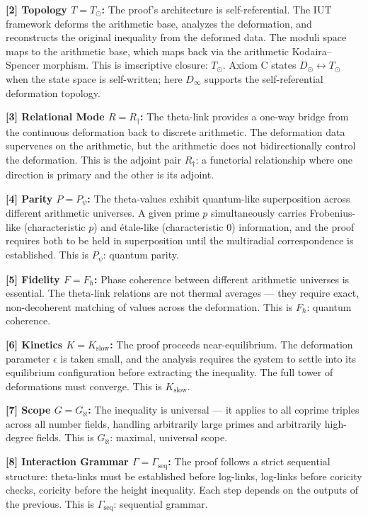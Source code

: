 \documentclass[12pt,a4paper]{article}
\begin{document}
\textbf{{[}2{]} Topology $T = T_{\odot}$:} The proof's architecture is self-referential. The IUT framework deforms the arithmetic base, analyzes the deformation, and reconstructs the original inequality from the deformed data. The moduli space maps to the arithmetic base, which maps back via the arithmetic Kodaira--Spencer morphism. This is imscriptive closure: $T_{\odot}$. Axiom C states $D_{\odot} \leftrightarrow T_{\odot}$ when the state space is self-written; here $D_{\infty}$ supports the self-referential deformation topology.

\textbf{{[}3{]} Relational Mode $R = R_{\dagger}$:} The theta-link provides a one-way bridge from the continuous deformation back to discrete arithmetic. The deformation data supervenes on the arithmetic, but the arithmetic does not bidirectionally control the deformation. This is the adjoint pair $R_{\dagger}$: a functorial relationship where one direction is primary and the other is its adjoint.

\textbf{{[}4{]} Parity $P = P_{\psi}$:} The theta-values exhibit quantum-like superposition across different arithmetic universes. A given prime $p$ simultaneously carries Frobenius-like (characteristic $p$) and étale-like (characteristic $0$) information, and the proof requires both to be held in superposition until the multiradial correspondence is established. This is $P_{\psi}$: quantum parity.

\textbf{{[}5{]} Fidelity $F = F_{\hbar}$:} Phase coherence between different arithmetic universes is essential. The theta-link relations are not thermal averages --- they require exact, non-decoherent matching of values across the deformation. This is $F_{\hbar}$: quantum coherence.

\textbf{{[}6{]} Kinetics $K = K_\text{slow}$:} The proof proceeds near-equilibrium. The deformation parameter $\epsilon$ is taken small, and the analysis requires the system to settle into its equilibrium configuration before extracting the inequality. The full tower of deformations must converge. This is $K_\text{slow}$.

\textbf{{[}7{]} Scope $G = G_{\aleph}$:} The inequality is universal --- it applies to all coprime triples across all number fields, handling arbitrarily large primes and arbitrarily high-degree fields. This is $G_{\aleph}$: maximal, universal scope.

\textbf{{[}8{]} Interaction Grammar $\Gamma = \Gamma_\text{seq}$:} The proof follows a strict sequential structure: theta-links must be established before log-links, log-links before coricity checks, coricity before the height inequality. Each step depends on the outputs of the previous. This is $\Gamma_\text{seq}$: sequential grammar.
\end{document}
